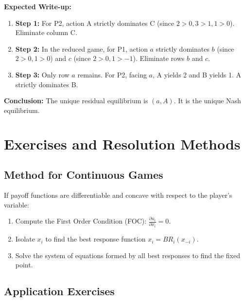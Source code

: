 \textbf{Expected Write-up:}
\begin{enumerate}
    \item \textbf{Step 1:} For P2, action A strictly dominates C (since $2>0, 3>1, 1>0$). Eliminate column C.
    \item \textbf{Step 2:} In the reduced game, for P1, action $a$ strictly dominates $b$ (since $2>0, 1>0$) and $c$ (since $2>0, 1>-1$). Eliminate rows $b$ and $c$.
    \item \textbf{Step 3:} Only row $a$ remains. For P2, facing $a$, A yields 2 and B yields 1. A strictly dominates B.
\end{enumerate}
\textbf{Conclusion:} The unique residual equilibrium is $(a, A)$. It is the unique Nash equilibrium.

\section{Exercises and Resolution Methods}

\subsection{Method for Continuous Games}
If payoff functions are differentiable and concave with respect to the player's variable:
\begin{enumerate}
    \item Compute the First Order Condition (FOC): $\frac{\partial u_i}{\partial x_i} = 0$.
    \item Isolate $x_i$ to find the best response function $x_i = BR_i(x_{-i})$.
    \item Solve the system of equations formed by all best responses to find the fixed point.
\end{enumerate}

\subsection{Application Exercises}

